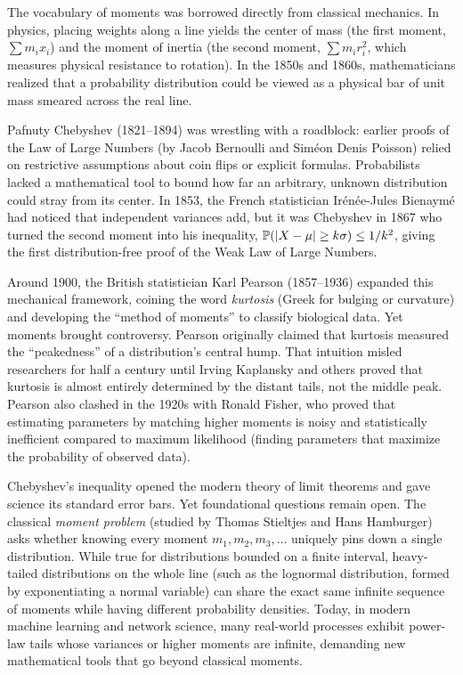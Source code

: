 \begin{historybox}
The vocabulary of moments was borrowed directly from classical mechanics. In
physics, placing weights along a line yields the center of mass (the first
moment, $\sum m_i x_i$) and the moment of inertia (the second moment, $\sum m_i
r_i^2$, which measures physical resistance to rotation). In the 1850s and
1860s, mathematicians realized that a probability distribution could be viewed
as a physical bar of unit mass smeared across the real line.

Pafnuty Chebyshev (1821--1894) was wrestling with a roadblock:
earlier proofs of the Law of Large Numbers (by Jacob Bernoulli and Sim\'eon
Denis Poisson) relied on restrictive assumptions about coin flips or explicit
formulas. Probabilists lacked a mathematical tool to bound how far an arbitrary,
unknown distribution could stray from its center. In 1853, the French
statistician Ir\'en\'ee-Jules Bienaym\'e had noticed that independent variances
add, but it was Chebyshev in 1867 who turned the second moment into
his inequality, $\operatorname{\mathbb{P}}(\lvert X-\mu\rvert \ge k\sigma) \le 1/k^2$, giving the
first distribution-free proof of the Weak Law of Large Numbers.

Around 1900, the British statistician Karl Pearson (1857--1936) expanded this
mechanical framework, coining the word \emph{kurtosis} (Greek for bulging or
curvature) and developing the ``method of moments'' to classify biological
data. Yet moments brought controversy. Pearson originally claimed that kurtosis
measured the ``peakedness'' of a distribution's central hump. That intuition
misled researchers for half a century until Irving Kaplansky and others
proved that kurtosis is almost entirely determined by the distant tails, not
the middle peak. Pearson also clashed in the 1920s with Ronald Fisher,
who proved that estimating parameters by matching higher moments is noisy and
statistically inefficient compared to maximum likelihood (finding parameters
that maximize the probability of observed data).

Chebyshev's inequality opened the modern theory of limit theorems and gave
science its standard error bars. Yet foundational questions remain open. The classical
\emph{moment problem} (studied by Thomas Stieltjes and Hans Hamburger) asks
whether knowing every moment $m_1, m_2, m_3, \dots$ uniquely pins down a single
distribution. While true for distributions bounded on a finite interval, heavy-tailed
distributions on the whole line (such as the lognormal distribution, formed by exponentiating a normal variable) can share
the exact same infinite sequence of moments while having different probability
densities. Today, in modern machine learning and network science, many real-world
processes exhibit power-law tails whose variances or higher moments are infinite,
demanding new mathematical tools that go beyond classical moments.
\end{historybox}

